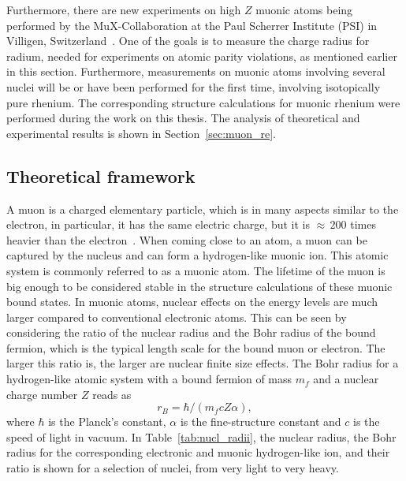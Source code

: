 Furthermore, there are new experiments on high $Z$ muonic atoms being performed by the MuX-Collaboration at the Paul Scherrer Institute (PSI) in Villigen, Switzerland~\cite{kirch2016}. One of the goals is to measure the charge radius for radium, needed for experiments on atomic parity violations, as mentioned earlier in this section. Furthermore, measurements on muonic atoms involving several nuclei will be or have been performed for the first time, involving isotopically pure rhenium. The corresponding structure calculations for muonic rhenium were performed during the work on this thesis. The analysis of theoretical and experimental results is shown in Section~\ref{sec:muon_re}.

\subsection{Theoretical framework}
\label{sec:muon_framework}
A muon is a charged elementary particle, which is in many aspects similar to the electron, in particular, it has the same electric charge, but it is ${\approx}\,{200}$ times heavier than the electron~\cite{codata}. When coming close to an atom, a muon can be captured by the nucleus and can form a hydrogen-like muonic ion. This atomic system is commonly referred to as a muonic atom. The lifetime of the muon is big enough to be considered stable in the structure calculations of these muonic bound states.
In muonic atoms, nuclear effects on the energy levels are much larger compared to conventional electronic atoms. This can be seen by considering the ratio of the nuclear radius and the Bohr radius of the bound fermion, which is the typical length scale for the bound muon or electron. The larger this ratio is, the larger are nuclear finite size effects. The Bohr radius for a hydrogen-like atomic system with a bound fermion of mass $m_f$ and a nuclear charge number $Z$ reads as
\begin{equation}
r_B = \hbar / (m_f c Z \alpha),
\end{equation}
where $\hbar$ is the Planck's constant, $\alpha$ is the fine-structure constant and $c$ is the speed of light in vacuum. In Table~\ref{tab:nucl_radii}, the nuclear radius, the Bohr radius for the corresponding electronic and muonic hydrogen-like ion, and their ratio is shown for a selection of nuclei, from very light to very heavy.
%
%
